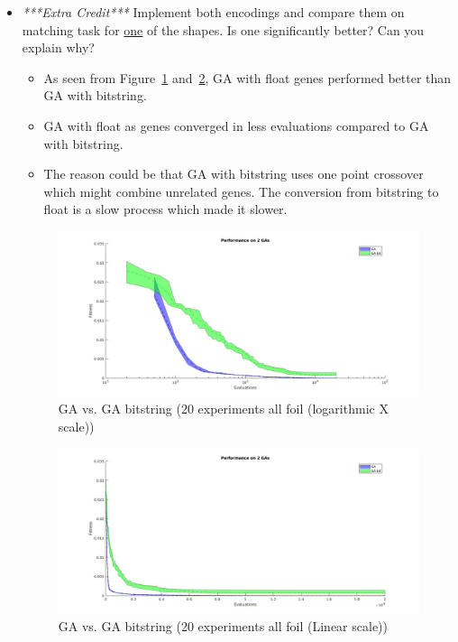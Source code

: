 \documentclass{article}
\begin{document}
\begin{itemize}
        \newpage
	\item \textit{***Extra Credit***} Implement both encodings and compare them on matching task for \underline{one} of the shapes. Is one significantly better? Can you explain why?
	\color{blue}
    \begin{itemize}
        \item As seen from Figure~\ref{fig:3} and~\ref{fig:4}, GA with float genes performed better than GA with bitstring.
        \item GA with float as genes converged in less evaluations compared to GA with bitstring.
        \item The reason could be that GA with bitstring uses one point crossover which might combine unrelated genes. The conversion from bitstring to float is a slow process which made it slower.
    \end{itemize}
    \color{black}
        \begin{figure}[ht!]
            \centering
            \includegraphics[width=1.0\linewidth]{ga_gaBit_20exp_3foil.jpg}
            \caption{GA vs. GA bitstring (20 experiments all foil (logarithmic X scale))\label{fig:3}}
        \end{figure}
        \begin{figure}[ht!]
            \centering
            \includegraphics[width=1.0\linewidth]{ga_gaBit_20exp_3foil_linear.jpg}
            \caption{GA vs. GA bitstring (20 experiments all foil (Linear scale)) \label{fig:4}}
        \end{figure}
\end{itemize}
\end{document}
